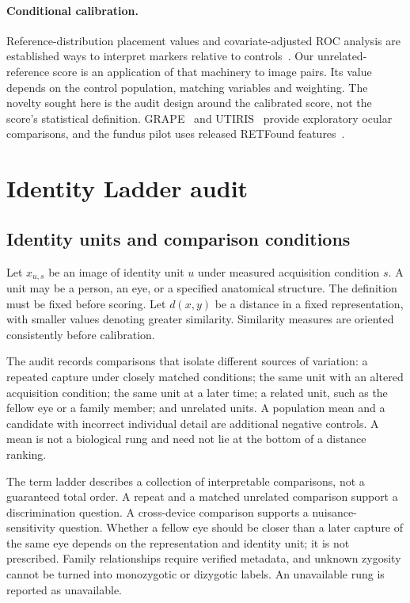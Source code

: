 \documentclass[10pt,twocolumn,letterpaper]{article}
\begin{document}
\paragraph{Conditional calibration.}
Reference-distribution placement values and covariate-adjusted ROC analysis are established ways to interpret markers relative to controls~\cite{pepe2005,janes2009}. Our unrelated-reference score is an application of that machinery to image pairs. Its value depends on the control population, matching variables and weighting. The novelty sought here is the audit design around the calibrated score, not the score's statistical definition. GRAPE~\cite{huang2023grape} and UTIRIS~\cite{hosseini2010} provide exploratory ocular comparisons, and the fundus pilot uses released RETFound features~\cite{zhou2023retfound}.

\section{Identity Ladder audit}
\subsection{Identity units and comparison conditions}
Let $x_{u,s}$ be an image of identity unit $u$ under measured acquisition condition $s$. A unit may be a person, an eye, or a specified anatomical structure. The definition must be fixed before scoring. Let $d(x,y)$ be a distance in a fixed representation, with smaller values denoting greater similarity. Similarity measures are oriented consistently before calibration.

The audit records comparisons that isolate different sources of variation: a repeated capture under closely matched conditions; the same unit with an altered acquisition condition; the same unit at a later time; a related unit, such as the fellow eye or a family member; and unrelated units. A population mean and a candidate with incorrect individual detail are additional negative controls. A mean is not a biological rung and need not lie at the bottom of a distance ranking.

The term ladder describes a collection of interpretable comparisons, not a guaranteed total order. A repeat and a matched unrelated comparison support a discrimination question. A cross-device comparison supports a nuisance-sensitivity question. Whether a fellow eye should be closer than a later capture of the same eye depends on the representation and identity unit; it is not prescribed. Family relationships require verified metadata, and unknown zygosity cannot be turned into monozygotic or dizygotic labels. An unavailable rung is reported as unavailable.
\end{document}
